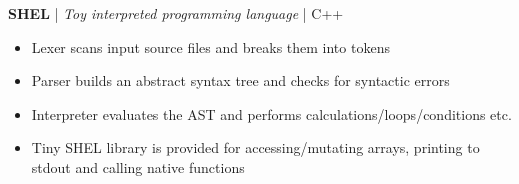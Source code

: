 \textbf{SHEL} | \textit{Toy interpreted programming language} | C++
\begin{itemize}
    \item Lexer scans input source files and breaks them into tokens
    \item Parser builds an abstract syntax tree and checks for syntactic errors
    \item Interpreter evaluates the AST and performs calculations/loops/conditions etc.
    \item Tiny SHEL library is provided for accessing/mutating arrays, printing to stdout and calling native functions
\end{itemize}
